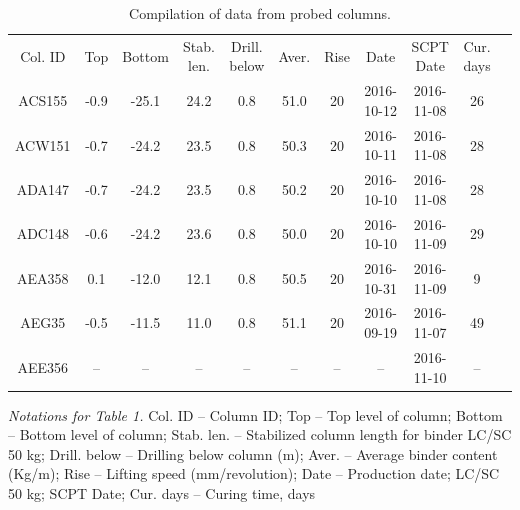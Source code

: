 \documentclass[final,3p,times,onecolumn,authoryear]{elsarticle}
\begin{document}
\begin{table}[t]
\begin{threeparttable}
   \caption{Compilation of data from probed columns.}
  \centering
  \begin{tabular}{| c c c c c c c c c c c |}
    Col. ID & Top & Bottom & Stab. len. & Drill. below & Aver. & Rise & Date & SCPT Date & Cur. days \\
    ACS155 & -0.9 & -25.1 & 24.2 & 0.8 & 51.0 & 20 & 2016-10-12 & 2016-11-08 & 26 \\
    ACW151 & -0.7 & -24.2 & 23.5 & 0.8 & 50.3 & 20 & 2016-10-11 & 2016-11-08 & 28 \\
    ADA147 & -0.7 & -24.2 & 23.5 & 0.8 & 50.2 & 20 & 2016-10-10 & 2016-11-08 & 28 \\
    ADC148 & -0.6 & -24.2 & 23.6 & 0.8 & 50.0 & 20 & 2016-10-10 & 2016-11-09 & 29 \\
    AEA358 & 0.1 & -12.0 & 12.1 & 0.8 & 50.5 & 20 & 2016-10-31 & 2016-11-09 & 9 \\
    AEG35 & -0.5 & -11.5 & 11.0 & 0.8 & 51.1 & 20 & 2016-09-19 & 2016-11-07 & 49 \\
    AEE356 & -- & -- & -- & -- & -- & -- & -- & 2016-11-10 & --
  \end{tabular}
  \label{tab:1}
   \begin{tablenotes}
      \footnotesize
      	\item \emph{Notations for Table 1.} Col. ID -- Column ID; Top -- Top level of column; Bottom -- Bottom level of column; Stab. len. -- Stabilized column length for binder LC/SC 50 kg; Drill. below -- Drilling below column (m); Aver. -- Average binder content (Kg/m); Rise -- Lifting speed (mm/revolution); Date -- Production date; LC/SC 50 kg; SCPT Date; Cur. days -- Curing time, days
    \end{tablenotes}
  \end{threeparttable}
\end{table}
\end{document}
